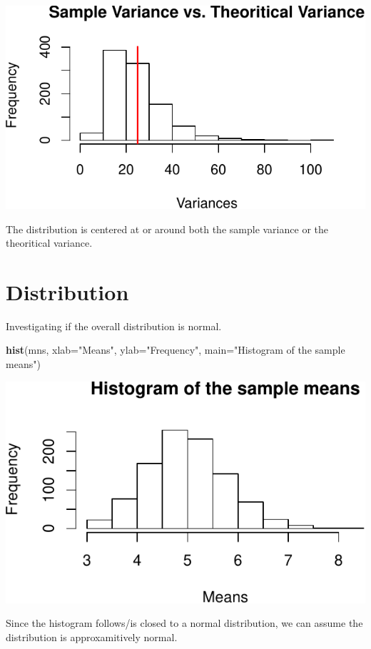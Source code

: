 \documentclass[]{article}
\newenvironment{Shaded}{\begin{snugshade}}{\end{snugshade}}
\newcommand{\KeywordTok}[1]{\textcolor[rgb]{0.13,0.29,0.53}{\textbf{{#1}}}}
\newcommand{\DataTypeTok}[1]{\textcolor[rgb]{0.13,0.29,0.53}{{#1}}}
\newcommand{\StringTok}[1]{\textcolor[rgb]{0.31,0.60,0.02}{{#1}}}
\newcommand{\NormalTok}[1]{{#1}}
\begin{document}
\includegraphics{statinference-courseproject-1-Question-1_files/figure-latex/unnamed-chunk-5-1.pdf}

The distribution is centered at or around both the sample variance or
the theoritical variance.

\section{Distribution}\label{distribution}

Investigating if the overall distribution is normal.

\begin{Shaded}
\begin{Highlighting}[]
\KeywordTok{hist}\NormalTok{(mns, }\DataTypeTok{xlab=}\StringTok{"Means"}\NormalTok{, }\DataTypeTok{ylab=}\StringTok{"Frequency"}\NormalTok{, }\DataTypeTok{main=}\StringTok{"Histogram of the sample means"}\NormalTok{)}
\end{Highlighting}
\end{Shaded}

\includegraphics{statinference-courseproject-1-Question-1_files/figure-latex/unnamed-chunk-6-1.pdf}

Since the histogram follows/is closed to a normal distribution, we can
assume the distribution is approxamitively normal.
\end{document}

